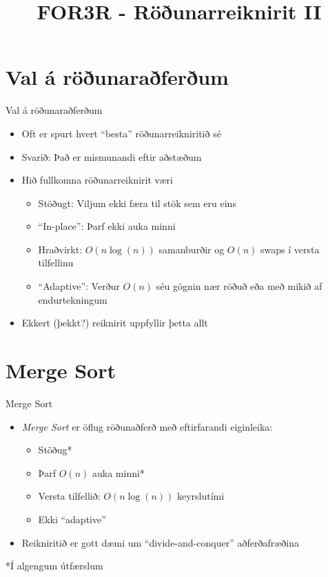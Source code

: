 \documentclass{beamer}
\title{FOR3R - Röðunarreiknirit II}
\begin{document}
\begin{frame}
\titlepage
\end{frame}

\section{Val á röðunaraðferðum}

\begin{frame}{Val á röðunaraðferðum}

\begin{itemize}
 \item Oft er spurt hvert ``besta'' röðunarreikniritið sé
 \item Svarið: Það er mismunandi eftir aðstæðum
 \item Hið fullkomna röðunarreiknirit væri
 \begin{itemize}
  \item Stöðugt: Viljum ekki færa til stök sem eru eins
  \item ``In-place'': Þarf ekki auka minni
  \item Hraðvirkt: $O(n \log(n))$ samanburðir og $O(n)$ swaps í versta tilfellinu
  \item ``Adaptive'': Verður $O(n)$ séu gögnin nær röðuð eða með mikið af endurtekningum
 \end{itemize}
 \item Ekkert (þekkt?) reiknirit uppfyllir þetta allt
\end{itemize}
\end{frame}

\section{Merge Sort}

\begin{frame}{Merge Sort}
\begin{itemize}
 \item \emph{Merge Sort} er öflug röðunaðferð með eftirfarandi eiginleika:
 \begin{itemize}
  \item Stöðug*
  \item Þarf $O(n)$ auka minni*
  \item Versta tilfellið: $O(n\log(n))$ keyrslutími
  \item Ekki ``adaptive''
 \end{itemize}
 \item Reikniritið er gott dæmi um ``divide-and-conquer'' aðferðafræðina
\end{itemize}
*Í algengum útfærslum
\end{frame}
\end{document}

